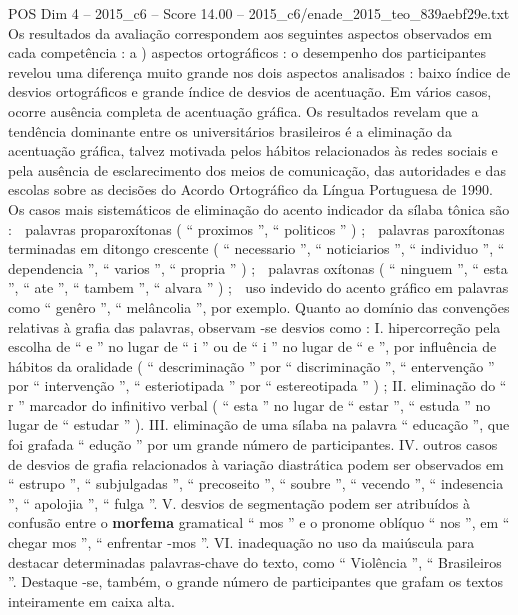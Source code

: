 \begin{textsample}{POS Dim 4 – 2015\_c6 – Score 14.00 – 2015\_c6/enade\_2015\_teo\_839aebf29e.txt}
Os resultados da avaliação correspondem aos seguintes aspectos observados em cada competência : a ) aspectos ortográficos : o desempenho dos participantes revelou uma diferença muito grande nos dois aspectos analisados : baixo índice de desvios ortográficos e grande índice de desvios de acentuação.
Em vários casos, ocorre ausência completa de acentuação gráfica.
Os resultados revelam que a tendência dominante entre os universitários brasileiros é a eliminação da acentuação gráfica, talvez motivada pelos hábitos relacionados às redes sociais e pela ausência de esclarecimento dos meios de comunicação, das autoridades e das escolas sobre as decisões do Acordo Ortográfico da Língua Portuguesa de 1990.
Os casos mais sistemáticos de eliminação do acento indicador da sílaba tônica são :  palavras proparoxítonas ( “ proximos ”, “ politicos ” ) ;  palavras paroxítonas terminadas em ditongo crescente ( “ necessario ”, “ noticiarios ”, “ individuo ”, “ dependencia ”, “ varios ”, “ propria ” ) ;  palavras oxítonas ( “ ninguem ”, “ esta ”, “ ate ”, “ tambem ”, “ alvara ” ) ;  uso indevido do acento gráfico em palavras como “ genêro ”, “ melâncolia ”, por exemplo.
Quanto ao domínio das convenções relativas à grafia das palavras, observam -se desvios como : I. hipercorreção pela escolha de “ e ” no lugar de “ i ” ou de “ i ” no lugar de “ e ”, por influência de hábitos da oralidade ( “ descriminação ” por “ discriminação ”, “ entervenção ” por “ intervenção ”, “ esteriotipada ” por “ estereotipada ” ) ; II. eliminação do “ r ” marcador do infinitivo verbal ( “ esta ” no lugar de “ estar ”, “ estuda ” no lugar de “ estudar ” ).
III. eliminação de uma sílaba na palavra “ educação ”, que foi grafada “ edução ” por um grande número de participantes.
IV. outros casos de desvios de grafia relacionados à variação diastrática podem ser observados em “ estrupo ”, “ subjulgadas ”, “ precoseito ”, “ soubre ”, “ vecendo ”, “ indesencia ”, “ apolojia ”, “ fulga ”.
V. desvios de segmentação podem ser atribuídos à confusão entre o \textbf{morfema} gramatical “ mos ” e o pronome oblíquo “ nos ”, em “ chegar mos ”, “ enfrentar -mos ”.
VI. inadequação no uso da maiúscula para destacar determinadas palavras-chave do texto, como “ Violência ”, “ Brasileiros ”.
Destaque -se, também, o grande número de participantes que grafam os textos inteiramente em caixa alta.

\end{textsample}
